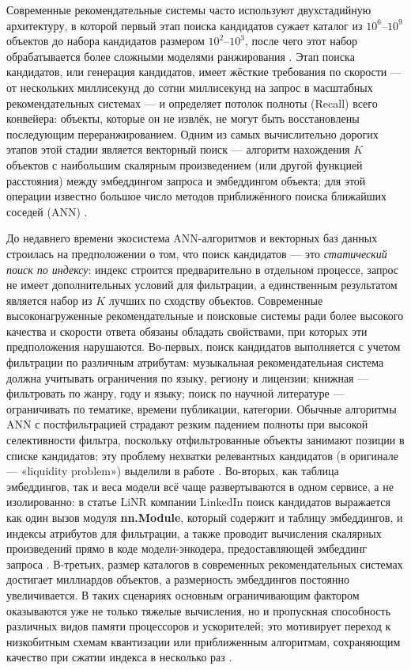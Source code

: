\documentclass[14pt,a4paper]{extreport}
\numberwithin{figure}{chapter}
\numberwithin{table}{chapter}
\numberwithin{equation}{chapter}
\begin{document}
Современные рекомендательные системы часто используют двухстадийную архитектуру, в которой первый этап поиска кандидатов сужает каталог из $10^6$--$10^9$ объектов до набора кандидатов размером $10^2$--$10^3$, после чего этот набор обрабатывается более сложными моделями ранжирования \cite{covington2016deep, yi2019sampling}. Этап поиска кандидатов, или генерация кандидатов, имеет жёсткие требования по скорости --- от нескольких миллисекунд до сотни миллисекунд на запрос в масштабных рекомендательных системах --- и определяет потолок полноты (Recall) всего конвейера: объекты, которые он не извлёк, не могут быть восстановлены последующим переранжированием. Одним из самых вычислительно дорогих этапов этой стадии является векторный поиск --- алгоритм нахождения $K$ объектов с наибольшим скалярным произведением (или другой функцией расстояния) между эмбеддингом запроса и эмбеддингом объекта; для этой операции известно большое число методов приближённого поиска ближайших соседей (ANN) \cite{jegou2011product, ootomo2024cagra, wang2021milvus, zhao2020song}.

До недавнего времени экосистема ANN-алгоритмов и векторных баз данных строилась на предположении о том, что поиск кандидатов --- это \textit{статический поиск по индексу}: индекс строится предварительно в отдельном процессе, запрос не имеет дополнительных условий для фильтрации, а единственным результатом является набор из $K$ лучших по сходству объектов. Современные высоконагруженные рекомендательные и поисковые системы ради более высокого качества и скорости ответа обязаны обладать свойствами, при которых эти предположения нарушаются. Во-первых, поиск кандидатов выполняется с учетом фильтрации по различным атрибутам: музыкальная рекомендательная система должна учитывать ограничения по языку, региону и лицензии; книжная --- фильтровать по жанру, году и языку; поиск по научной литературе --- ограничивать по тематике, времени публикации, категории. Обычные алгоритмы ANN с постфильтрацией страдают резким падением полноты при высокой селективности фильтра, поскольку отфильтрованные объекты занимают позиции в списке кандидатов; эту проблему нехватки релевантных кандидатов (в оригинале --- «liquidity problem») выделили в работе \cite{borisyuk2024linr}. Во-вторых, как таблица эмбеддингов, так и веса модели всё чаще развертываются в одном сервисе, а не изолированно: в статье LiNR компании LinkedIn поиск кандидатов выражается как один вызов модуля \textbf{nn.Module}, который содержит и таблицу эмбеддингов, и индексы атрибутов для фильтрации, а также проводит вычисления скалярных произведений прямо в коде модели-энкодера, предоставляющей эмбеддинг запроса \cite{borisyuk2024linr}. В-третьих, размер каталогов в современных рекомендательных системах достигает миллиардов объектов, а размерность эмбеддингов постоянно увеличивается. В таких сценариях основным ограничивающим фактором оказываются уже не только тяжелые вычисления, но и пропускная способность различных видов памяти процессоров и ускорителей; это мотивирует переход к низкобитным схемам квантизации или приближенным алгоритмам, сохраняющим качество при сжатии индекса в несколько раз \cite{li2023oporp, nvidia2024cuda}.
\end{document}
